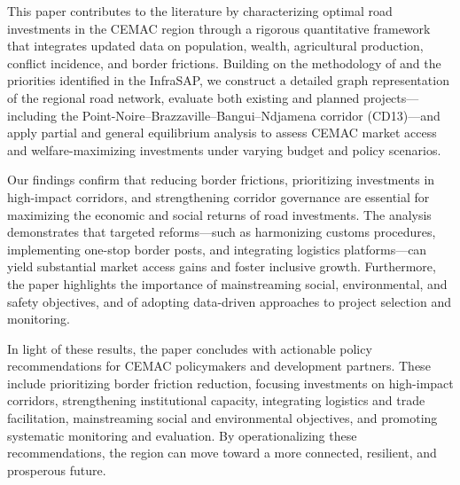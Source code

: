 \documentclass[a4paper]{article}
\begin{document}
This paper contributes to the literature by characterizing optimal road investments in the CEMAC region through a rigorous quantitative framework that integrates updated data on population, wealth, agricultural production, conflict incidence, and border frictions. Building on the methodology of \citet{krantz2024optimal} and the priorities identified in the InfraSAP, we construct a detailed graph representation of the regional road network, evaluate both existing and planned projects—including the Point-Noire–Brazzaville–Bangui–Ndjamena corridor (CD13)—and apply partial and general equilibrium analysis to assess CEMAC market access and welfare-maximizing investments under varying budget and policy scenarios.\newline 

Our findings confirm that reducing border frictions, prioritizing investments in high-impact corridors, and strengthening corridor governance are essential for maximizing the economic and social returns of road investments. The analysis demonstrates that targeted reforms—such as harmonizing customs procedures, implementing one-stop border posts, and integrating logistics platforms—can yield substantial market access gains and foster inclusive growth. Furthermore, the paper highlights the importance of mainstreaming social, environmental, and safety objectives, and of adopting data-driven approaches to project selection and monitoring. \newline 

In light of these results, the paper concludes with actionable policy recommendations for CEMAC policymakers and development partners. These include prioritizing border friction reduction, focusing investments on high-impact corridors, strengthening institutional capacity, integrating logistics and trade facilitation, mainstreaming social and environmental objectives, and promoting systematic monitoring and evaluation. By operationalizing these recommendations, the region can move toward a more connected, resilient, and prosperous future. \newline

\end{document}
